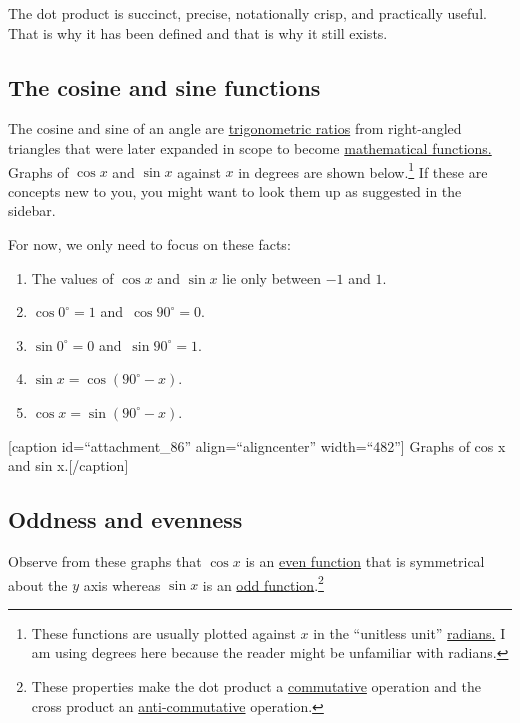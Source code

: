 \documentclass[
  a4paper,
]{article}
\begin{document}
The dot product is succinct, precise, notationally crisp, and
practically useful. That is why it has been defined and that is why it
still exists.

\hypertarget{the-cosine-and-sine-functions}{%
\subsection{The cosine and sine
functions}\label{the-cosine-and-sine-functions}}

The cosine and sine of an angle are
\href{http://en.wikipedia.org/wiki/Trigonometric_Ratios}{trigonometric
ratios} from right-angled triangles that were later expanded in scope to
become
\href{http://mathworld.wolfram.com/Trigonometry.html}{mathematical
functions.} Graphs of \(\cos x\) and \(\sin x\) against \(x\) in degrees
are shown below.\footnote{These functions are usually plotted against
  \(x\) in the ``unitless unit''
  \href{http://en.wikipedia.org/wiki/Radian}{radians.} I am using
  degrees here because the reader might be unfamiliar with radians.} If
these are concepts new to you, you might want to look them up as
suggested in the sidebar.

For now, we only need to focus on these facts:

\begin{enumerate}
\item
  The values of \(\cos x\) and \(\sin x\) lie only between \(-1\) and
  \(1\).
\item
  \(\cos 0^{\circ} = 1\) and~\(\cos 90^{\circ} =0\).
\item
  \(\sin 0^{\circ} = 0\) and~\(\sin 90^{\circ} =1\).
\item
  \(\sin x = \cos (90^{\circ} - x)\).
\item
  \(\cos x = \sin (90^{\circ} - x)\).
\end{enumerate}

{[}caption id=``attachment\_86'' align=``aligncenter'' width=``482''{]}
Graphs of cos x and sin x.{[}/caption{]}

\hypertarget{oddness-and-evenness}{%
\subsection{Oddness and evenness}\label{oddness-and-evenness}}

Observe from these graphs that \(\cos x\) is an
\href{http://mathworld.wolfram.com/EvenFunction.html}{even function}
that is symmetrical about the \(y\) axis whereas \(\sin x\) is an
\href{http://mathworld.wolfram.com/OddFunction.html}{odd
function}.\footnote{These properties make the dot product a
  \href{http://mathworld.wolfram.com/Commutative.html}{commutative}
  operation and the cross product an
  \href{http://mathworld.wolfram.com/Anticommutative.html}{anti-commutative}
  operation.}
\end{document}
